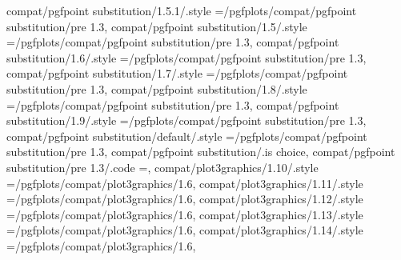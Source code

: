 {{{{{{{{{{{{{{{{{{{compat/pgfpoint substitution/1.5.1/.style                          ={/pgfplots/compat/pgfpoint substitution/pre 1.3},                                                                                 
compat/pgfpoint substitution/1.5/.style                            ={/pgfplots/compat/pgfpoint substitution/pre 1.3},                                                                                 
compat/pgfpoint substitution/1.6/.style                            ={/pgfplots/compat/pgfpoint substitution/pre 1.3},                                                                                  
compat/pgfpoint substitution/1.7/.style                            ={/pgfplots/compat/pgfpoint substitution/pre 1.3},                                                                                  
compat/pgfpoint substitution/1.8/.style                            ={/pgfplots/compat/pgfpoint substitution/pre 1.3},                                                                                  
compat/pgfpoint substitution/1.9/.style                            ={/pgfplots/compat/pgfpoint substitution/pre 1.3},                                                                                  
compat/pgfpoint substitution/default/.style                        ={/pgfplots/compat/pgfpoint substitution/pre 1.3},                                                                                 
compat/pgfpoint substitution/.is choice,
compat/pgfpoint substitution/pre 1.3/.code                         ={\pgfplots@substitute@pgfpointfalse},                                                                                              
compat/plot3graphics/1.10/.style                                   ={/pgfplots/compat/plot3graphics/1.6},                                                                                             
compat/plot3graphics/1.11/.style                                   ={/pgfplots/compat/plot3graphics/1.6},                                                                                             
compat/plot3graphics/1.12/.style                                   ={/pgfplots/compat/plot3graphics/1.6},                                                                                             
compat/plot3graphics/1.13/.style                                   ={/pgfplots/compat/plot3graphics/1.6},                                                                                             
compat/plot3graphics/1.14/.style                                   ={/pgfplots/compat/plot3graphics/1.6},                                                                                             
}}}}}}}}}}}}}}}}}}}
